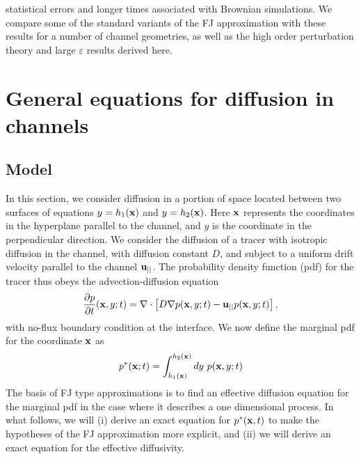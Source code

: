 \documentclass[pre,showpacs,preprintnumbers,amsmath,amssymb,superscriptaddress]{revtex4-1}
\begin{document}
statistical errors and longer times associated with Brownian simulations. We compare some of the standard variants of the FJ approximation with these results for a number of channel geometries, as well as the high order perturbation theory and large $\varepsilon$ results derived here. 

%








\section{General equations for diffusion in channels}
\label{Sec1}

\subsection{Model}
In this section, we consider diffusion in a portion of space located between two surfaces of equations $y=h_1({\bf x})$ and $y=h_2({\bf x})$. Here ${\bf x}$ represents the  coordinates in the hyperplane parallel to the channel, and $y$ is the coordinate in the perpendicular direction. 
We consider the diffusion of a tracer with isotropic diffusion in the channel, with diffusion constant $D$, and subject to a uniform drift velocity parallel to the channel ${\bf u}_{||}$. The 
probability density function (pdf) for the tracer thus obeys the advection-diffusion equation
\begin{equation}
\frac{\partial p}{\partial t}({\bf x},y;t) = \nabla\cdot \left[ D \nabla p({\bf x},y;t)- {\bf u}_{||} p({\bf x},y;t)\right].\label{deq}
\end{equation}
with no-flux boundary condition at the interface. 
We now define the marginal pdf for the coordinate ${\bf x}$ as
\begin{equation}
p^*({\bf x};t) = \int_{h_1({\bf x})}^{h_2({\bf x})} dy\ p({\bf x},y;t)\label{pstar}
\end{equation}
The basis of FJ type approximations is to find an effective diffusion equation for the marginal pdf in the case where it describes a one dimensional process. In what follows, we will (i) derive an exact equation for $p^*({\bf x},t)$ to make the hypotheses of the FJ approximation more explicit, and (ii) we will derive an exact equation for the effective diffusivity. 
\end{document}
